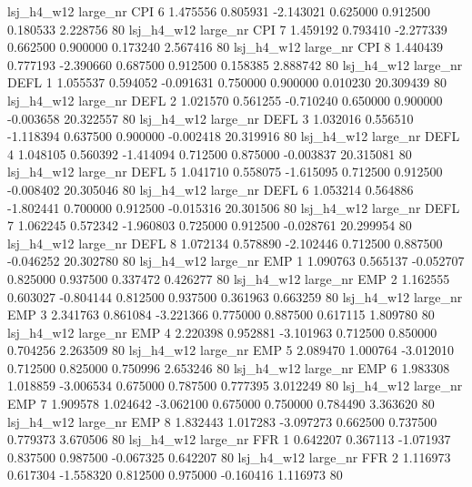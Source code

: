   lsj_h4_w12   large_nr      CPI                 6  1.475556  0.805931  -2.143021 0.625000 0.912500  0.180533    2.228756 80
  lsj_h4_w12   large_nr      CPI                 7  1.459192  0.793410  -2.277339 0.662500 0.900000  0.173240    2.567416 80
  lsj_h4_w12   large_nr      CPI                 8  1.440439  0.777193  -2.390660 0.687500 0.912500  0.158385    2.888742 80
  lsj_h4_w12   large_nr     DEFL                 1  1.055537  0.594052  -0.091631 0.750000 0.900000  0.010230   20.309439 80
  lsj_h4_w12   large_nr     DEFL                 2  1.021570  0.561255  -0.710240 0.650000 0.900000 -0.003658   20.322557 80
  lsj_h4_w12   large_nr     DEFL                 3  1.032016  0.556510  -1.118394 0.637500 0.900000 -0.002418   20.319916 80
  lsj_h4_w12   large_nr     DEFL                 4  1.048105  0.560392  -1.414094 0.712500 0.875000 -0.003837   20.315081 80
  lsj_h4_w12   large_nr     DEFL                 5  1.041710  0.558075  -1.615095 0.712500 0.912500 -0.008402   20.305046 80
  lsj_h4_w12   large_nr     DEFL                 6  1.053214  0.564886  -1.802441 0.700000 0.912500 -0.015316   20.301506 80
  lsj_h4_w12   large_nr     DEFL                 7  1.062245  0.572342  -1.960803 0.725000 0.912500 -0.028761   20.299954 80
  lsj_h4_w12   large_nr     DEFL                 8  1.072134  0.578890  -2.102446 0.712500 0.887500 -0.046252   20.302780 80
  lsj_h4_w12   large_nr      EMP                 1  1.090763  0.565137  -0.052707 0.825000 0.937500  0.337472    0.426277 80
  lsj_h4_w12   large_nr      EMP                 2  1.162555  0.603027  -0.804144 0.812500 0.937500  0.361963    0.663259 80
  lsj_h4_w12   large_nr      EMP                 3  2.341763  0.861084  -3.221366 0.775000 0.887500  0.617115    1.809780 80
  lsj_h4_w12   large_nr      EMP                 4  2.220398  0.952881  -3.101963 0.712500 0.850000  0.704256    2.263509 80
  lsj_h4_w12   large_nr      EMP                 5  2.089470  1.000764  -3.012010 0.712500 0.825000  0.750996    2.653246 80
  lsj_h4_w12   large_nr      EMP                 6  1.983308  1.018859  -3.006534 0.675000 0.787500  0.777395    3.012249 80
  lsj_h4_w12   large_nr      EMP                 7  1.909578  1.024642  -3.062100 0.675000 0.750000  0.784490    3.363620 80
  lsj_h4_w12   large_nr      EMP                 8  1.832443  1.017283  -3.097273 0.662500 0.737500  0.779373    3.670506 80
  lsj_h4_w12   large_nr      FFR                 1  0.642207  0.367113  -1.071937 0.837500 0.987500 -0.067325    0.642207 80
  lsj_h4_w12   large_nr      FFR                 2  1.116973  0.617304  -1.558320 0.812500 0.975000 -0.160416    1.116973 80
